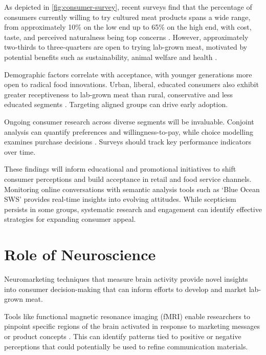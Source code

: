 \documentclass[10pt]{article}
\begin{document}
\begin{sloppypar}
  As depicted in \autoref{fig:consumer-survey}, recent surveys find that the percentage of consumers currently willing to try cultured meat products spans a wide range, from approximately 10\% on the low end up to 65\% on the high end, with cost, taste, and perceived naturalness being top concerns \citep{bryant_consumer_2018}. However, approximately two-thirds to three-quarters are open to trying lab-grown meat, motivated by potential benefits such as sustainability, animal welfare and health \citep{wilks_attitudes_2017}.

  Demographic factors correlate with acceptance, with younger generations more open to radical food innovations. Urban, liberal, educated consumers also exhibit greater receptiveness to lab-grown meat than rural, conservative and less educated segments \citep{circus_exploring_2018}. Targeting aligned groups can drive early adoption.

  Ongoing consumer research across diverse segments will be invaluable. Conjoint analysis can quantify preferences and willingness-to-pay, while choice modelling examines purchase decisions \citep{wilks_attitudes_2017}. Surveys should track key performance indicators over time.

  These findings will inform educational and promotional initiatives to shift consumer perceptions and build acceptance in retail and food service channels. Monitoring online conversations with semantic analysis tools such as ‘Blue Ocean SWS’ provides real-time insights into evolving attitudes. While scepticism persists in some groups, systematic research and engagement can identify effective strategies for expanding consumer appeal.

  \section{Role of Neuroscience}
  \label{sec:role-of-neuroscience}

  Neuromarketing techniques that measure brain activity provide novel insights into consumer decision-making that can inform efforts to develop and market lab-grown meat.

  Tools like functional magnetic resonance imaging (fMRI) enable researchers to pinpoint specific regions of the brain activated in response to marketing messages or product concepts \citep{bryant_consumer_2018}. This can identify patterns tied to positive or negative perceptions that could potentially be used to refine communication materials.


\end{sloppypar}
\end{document}
